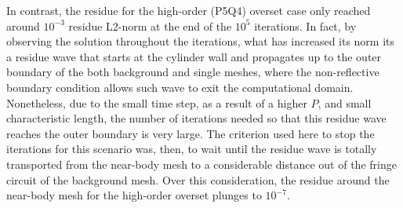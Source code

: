 In contrast, the residue for the high-order (P5Q4) overset case only reached around $10^{-3}$ residue L2-norm at the end of the $10^{5}$ iterations. In fact, by observing the solution throughout the iterations, what has increased its norm its a residue wave that starts at the cylinder wall and propagates up to the outer boundary of the both background and single meshes, where the non-reflective boundary condition allows such wave to exit the computational domain. Nonetheless, due to the small time step, as a result of a higher $P$, and small characteristic length, the number of iterations needed so that this residue wave reaches the outer boundary is very large. The criterion used here to stop the iterations for this scenario was, then, to wait until the residue wave is totally transported from the near-body mesh to a considerable distance out of the fringe circuit of the background mesh. Over this consideration, the residue around the near-body mesh for the high-order overset plunges to $10^{-7}$.

